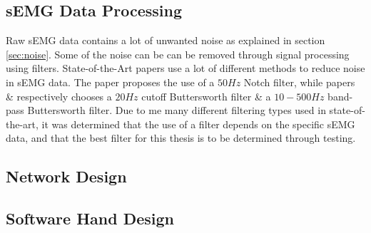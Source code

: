 \documentclass[../main.tex]{subfiles}
\begin{document}
\subsection{sEMG Data Processing}

Raw sEMG data contains a lot of unwanted noise as explained in section \ref{sec:noise}.
Some of the noise can be can be removed through signal processing using filters.
State-of-the-Art papers use a lot of different methods to reduce noise in sEMG data.
The paper \cite{multdof} proposes the use of a $50Hz$ Notch filter, while papers \cite{graspintent} \& \cite{ashirbad2022} respectively chooses a $20Hz$ cutoff Buttersworth filter \& a $10-500Hz$ band-pass Buttersworth filter.
Due to me many different filtering types used in state-of-the-art, it was determined that the use of a filter depends on the specific sEMG data, and that the best filter for this thesis is to be determined through testing.

\subsection{Network Design}
\subsection{Software Hand Design}
\end{document}
